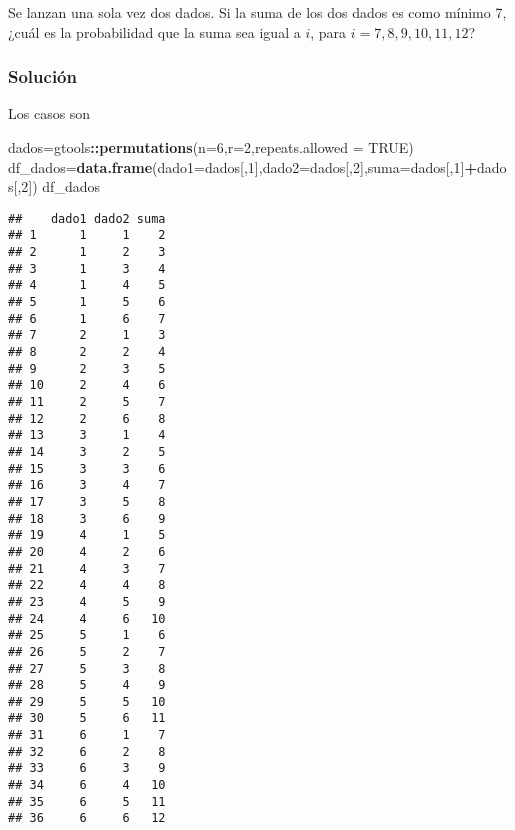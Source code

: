 \documentclass[
]{article}
\newenvironment{Shaded}{\begin{snugshade}}{\end{snugshade}}
\newcommand{\DataTypeTok}[1]{\textcolor[rgb]{0.13,0.29,0.53}{#1}}
\newcommand{\DecValTok}[1]{\textcolor[rgb]{0.00,0.00,0.81}{#1}}
\newcommand{\KeywordTok}[1]{\textcolor[rgb]{0.13,0.29,0.53}{\textbf{#1}}}
\newcommand{\NormalTok}[1]{#1}
\newcommand{\OperatorTok}[1]{\textcolor[rgb]{0.81,0.36,0.00}{\textbf{#1}}}
\newcommand{\OtherTok}[1]{\textcolor[rgb]{0.56,0.35,0.01}{#1}}
\begin{document}
Se lanzan una sola vez dos dados. Si la suma de los dos dados es como
mínimo 7, ¿cuál es la probabilidad que la suma sea igual a \(i\), para
\(i=7,8,9,10,11,12\)?

\hypertarget{soluciuxf3n-7}{%
\subsubsection{Solución}\label{soluciuxf3n-7}}

Los casos son

\begin{Shaded}
\begin{Highlighting}[]
\NormalTok{dados=gtools}\OperatorTok{::}\KeywordTok{permutations}\NormalTok{(}\DataTypeTok{n=}\DecValTok{6}\NormalTok{,}\DataTypeTok{r=}\DecValTok{2}\NormalTok{,}\DataTypeTok{repeats.allowed =} \OtherTok{TRUE}\NormalTok{)}
\NormalTok{df_dados=}\KeywordTok{data.frame}\NormalTok{(}\DataTypeTok{dado1=}\NormalTok{dados[,}\DecValTok{1}\NormalTok{],}\DataTypeTok{dado2=}\NormalTok{dados[,}\DecValTok{2}\NormalTok{],}\DataTypeTok{suma=}\NormalTok{dados[,}\DecValTok{1}\NormalTok{]}\OperatorTok{+}\NormalTok{dados[,}\DecValTok{2}\NormalTok{])}
\NormalTok{df_dados}
\end{Highlighting}
\end{Shaded}

\begin{verbatim}
##    dado1 dado2 suma
## 1      1     1    2
## 2      1     2    3
## 3      1     3    4
## 4      1     4    5
## 5      1     5    6
## 6      1     6    7
## 7      2     1    3
## 8      2     2    4
## 9      2     3    5
## 10     2     4    6
## 11     2     5    7
## 12     2     6    8
## 13     3     1    4
## 14     3     2    5
## 15     3     3    6
## 16     3     4    7
## 17     3     5    8
## 18     3     6    9
## 19     4     1    5
## 20     4     2    6
## 21     4     3    7
## 22     4     4    8
## 23     4     5    9
## 24     4     6   10
## 25     5     1    6
## 26     5     2    7
## 27     5     3    8
## 28     5     4    9
## 29     5     5   10
## 30     5     6   11
## 31     6     1    7
## 32     6     2    8
## 33     6     3    9
## 34     6     4   10
## 35     6     5   11
## 36     6     6   12
\end{verbatim}

\begin{Shaded}
\end{Shaded}
\end{document}

